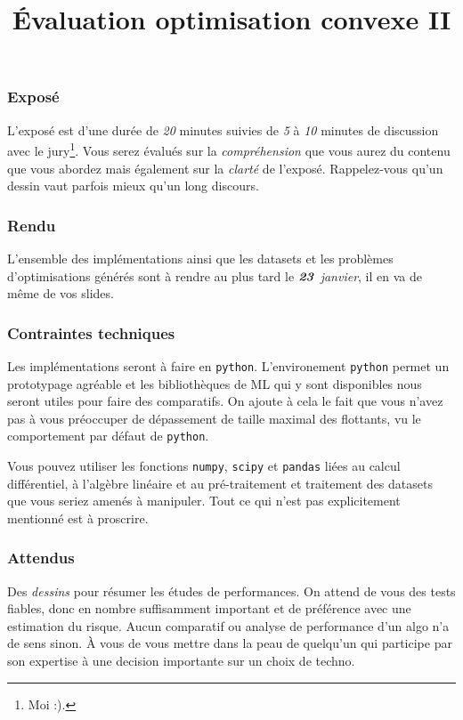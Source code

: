 \documentclass[11pt, a4paper]{article}
\title{%
  { \huge Évaluation optimisation convexe II}%
}
\author{}
\date{}
\begin{document}
\maketitle\thispagestyle{fancy}


\subsubsection*{Exposé}

L'exposé est d'une durée de \emph{20} minutes suivies de \emph{5} à
\emph{10} minutes de discussion avec le jury\footnote{Moi :).}.  Vous
serez évalués sur la \emph{compréhension} que vous aurez du contenu
que vous abordez mais également sur la \emph{clarté} de
l'exposé. Rappelez-vous qu'un dessin vaut parfois mieux qu'un long
discours.

\subsubsection*{Rendu}

L'ensemble des implémentations ainsi que les datasets et les problèmes
d'optimisations générés sont à rendre au plus tard le
\emph{$\boldsymbol{\mathit{23}}$ janvier}, il en va de même de vos slides.

\subsubsection*{Contraintes techniques}

Les implémentations seront à faire en \texttt{python}. L'environement
\texttt{python} permet un prototypage agréable et les bibliothèques de
ML qui y sont disponibles nous seront utiles pour faire des
comparatifs. On ajoute à cela le fait que vous n'avez pas à vous
préoccuper de dépassement de taille maximal des flottants, vu le
comportement par défaut de \texttt{python}.

Vous pouvez utiliser les fonctions \texttt{numpy}, \texttt{scipy} et
\texttt{pandas} liées au calcul différentiel, à l'algèbre linéaire et
au pré-traitement et traitement des datasets que vous seriez amenés à
manipuler. Tout ce qui n'est pas explicitement mentionné est à
proscrire.

\subsubsection*{Attendus}

Des \emph{dessins} pour résumer les études de performances. On attend
de vous des tests fiables, donc en nombre suffisamment important et de
préférence avec une estimation du risque. Aucun comparatif ou analyse
de performance d'un algo n'a de sens sinon. À vous de vous mettre dans
la peau de quelqu'un qui participe par son expertise à une decision
importante sur un choix de techno.
\end{document}
